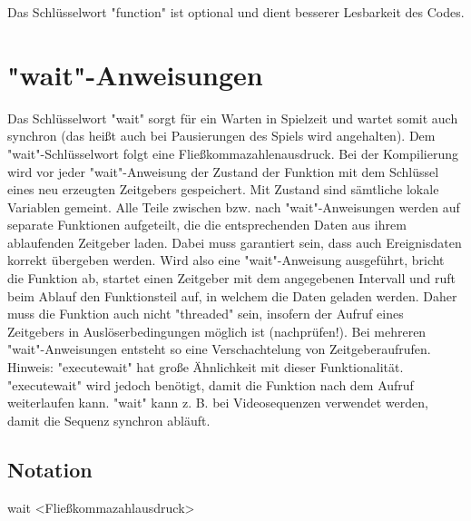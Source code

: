 Das Schlüsselwort "function" ist optional und dient besserer Lesbarkeit des Codes.

\section{"wait"-Anweisungen}
Das Schlüsselwort "wait" sorgt für ein Warten in Spielzeit und wartet somit auch synchron (das heißt auch bei Pausierungen des Spiels wird angehalten).
Dem "wait"-Schlüsselwort folgt eine Fließkommazahlenausdruck. Bei der Kompilierung wird vor jeder "wait"-Anweisung der Zustand der Funktion mit dem Schlüssel eines neu erzeugten Zeitgebers gespeichert.
Mit Zustand sind sämtliche lokale Variablen gemeint.
Alle Teile zwischen bzw. nach "wait"-Anweisungen werden auf separate Funktionen aufgeteilt, die die entsprechenden Daten aus ihrem ablaufenden Zeitgeber laden.
Dabei muss garantiert sein, dass auch Ereignisdaten korrekt übergeben werden. Wird also eine "wait"-Anweisung ausgeführt, bricht die Funktion ab, startet einen Zeitgeber mit dem angegebenen Intervall und ruft beim Ablauf den Funktionsteil auf, in welchem die Daten geladen werden.
Daher muss die Funktion auch nicht "threaded" sein, insofern der Aufruf eines Zeitgebers in Auslöserbedingungen möglich ist (nachprüfen!).
Bei mehreren "wait"-Anweisungen entsteht so eine Verschachtelung von Zeitgeberaufrufen.
Hinweis: "executewait" hat große Ähnlichkeit mit dieser Funktionalität. "executewait" wird jedoch benötigt, damit die Funktion nach dem Aufruf weiterlaufen kann.
"wait" kann z. B. bei Videosequenzen verwendet werden, damit die Sequenz synchron abläuft.

\subsection{Notation}
wait <Fließkommazahlausdruck>

